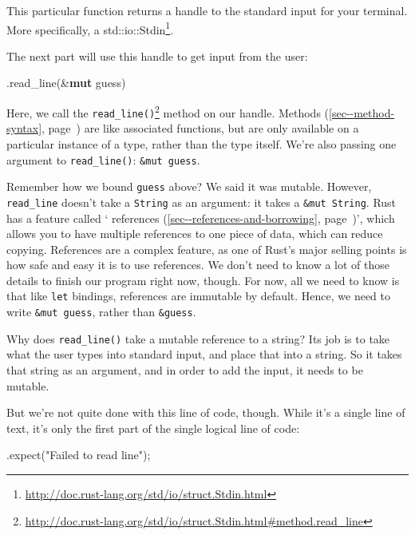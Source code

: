 \documentclass[a4paper,]{book}
\renewcommand*{\hyperref}[2][\ar]{%
  \def\ar{#2}%
  #2 (\autoref{#1}, page~\pageref{#1})}
\newenvironment{Shaded}{\begin{snugshade}}{\end{snugshade}}
\newcommand{\KeywordTok}[1]{\textcolor[rgb]{0.13,0.29,0.53}{\textbf{{#1}}}}
\newcommand{\StringTok}[1]{\textcolor[rgb]{0.31,0.60,0.02}{{#1}}}
\newcommand{\NormalTok}[1]{{#1}}
\renewcommand{\href}[2]{#2\footnote{\url{#1}}}
\begin{document}
This particular function returns a handle to the standard input for your
terminal. More specifically, a
\href{http://doc.rust-lang.org/std/io/struct.Stdin.html}{std::io::Stdin}.

The next part will use this handle to get input from the user:

\begin{Shaded}
\begin{Highlighting}[]
\NormalTok{.read_line(&}\KeywordTok{mut} \NormalTok{guess)}
\end{Highlighting}
\end{Shaded}

Here, we call the
\href{http://doc.rust-lang.org/std/io/struct.Stdin.html\#method.read_line}{\texttt{read\_line()}}
method on our handle. \hyperref[sec--method-syntax]{Methods} are like
associated functions, but are only available on a particular instance of
a type, rather than the type itself. We're also passing one argument to
\texttt{read\_line()}: \texttt{\&mut\ guess}.

Remember how we bound \texttt{guess} above? We said it was mutable.
However, \texttt{read\_line} doesn't take a \texttt{String} as an
argument: it takes a \texttt{\&mut\ String}. Rust has a feature called
`\hyperref[sec--references-and-borrowing]{references}', which allows you
to have multiple references to one piece of data, which can reduce
copying. References are a complex feature, as one of Rust's major
selling points is how safe and easy it is to use references. We don't
need to know a lot of those details to finish our program right now,
though. For now, all we need to know is that like \texttt{let} bindings,
references are immutable by default. Hence, we need to write
\texttt{\&mut\ guess}, rather than \texttt{\&guess}.

Why does \texttt{read\_line()} take a mutable reference to a string? Its
job is to take what the user types into standard input, and place that
into a string. So it takes that string as an argument, and in order to
add the input, it needs to be mutable.

But we're not quite done with this line of code, though. While it's a
single line of text, it's only the first part of the single logical line
of code:

\begin{Shaded}
\begin{Highlighting}[]
        \NormalTok{.expect(}\StringTok{"Failed to read line"}\NormalTok{);}
\end{Highlighting}
\end{Shaded}
\end{document}
